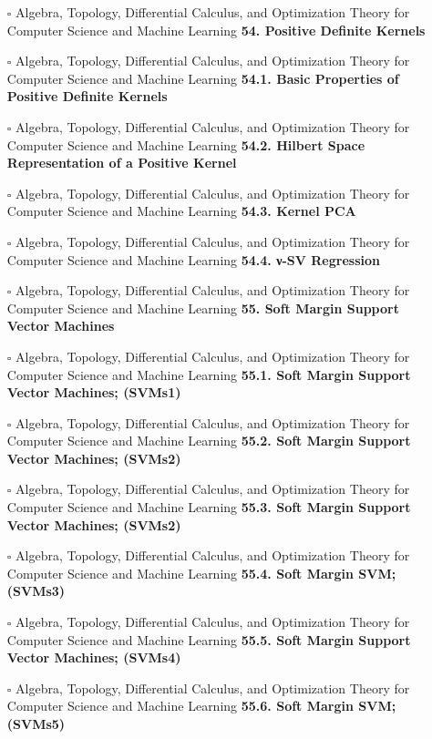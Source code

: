 \documentclass[a4, landscape, 12pt]{article}
\newcommand{\checkbox}{$\square$}%
\begin{document}
\begin{itemize}
{}
\item [\checkbox]  Algebra, Topology, Differential Calculus, and Optimization Theory for Computer Science and Machine Learning \textbf{ 54. Positive Definite Kernels
}
\item [\checkbox]  Algebra, Topology, Differential Calculus, and Optimization Theory for Computer Science and Machine Learning \textbf{ 54.1. Basic Properties of Positive Definite Kernels
}
\item [\checkbox]  Algebra, Topology, Differential Calculus, and Optimization Theory for Computer Science and Machine Learning \textbf{ 54.2. Hilbert Space Representation of a Positive Kernel
}
\item [\checkbox]  Algebra, Topology, Differential Calculus, and Optimization Theory for Computer Science and Machine Learning \textbf{ 54.3. Kernel PCA
}
\item [\checkbox]  Algebra, Topology, Differential Calculus, and Optimization Theory for Computer Science and Machine Learning \textbf{ 54.4. ν-SV Regression
}
\item [\checkbox]  Algebra, Topology, Differential Calculus, and Optimization Theory for Computer Science and Machine Learning \textbf{ 55. Soft Margin Support Vector Machines
}
\item [\checkbox]  Algebra, Topology, Differential Calculus, and Optimization Theory for Computer Science and Machine Learning \textbf{ 55.1. Soft Margin Support Vector Machines; (SVMs1)
}
\item [\checkbox]  Algebra, Topology, Differential Calculus, and Optimization Theory for Computer Science and Machine Learning \textbf{ 55.2. Soft Margin Support Vector Machines; (SVMs2)
}
\item [\checkbox]  Algebra, Topology, Differential Calculus, and Optimization Theory for Computer Science and Machine Learning \textbf{ 55.3. Soft Margin Support Vector Machines; (SVMs2)
}
\item [\checkbox]  Algebra, Topology, Differential Calculus, and Optimization Theory for Computer Science and Machine Learning \textbf{ 55.4. Soft Margin SVM; (SVMs3)
}
\item [\checkbox]  Algebra, Topology, Differential Calculus, and Optimization Theory for Computer Science and Machine Learning \textbf{ 55.5. Soft Margin Support Vector Machines; (SVMs4)
}
\item [\checkbox]  Algebra, Topology, Differential Calculus, and Optimization Theory for Computer Science and Machine Learning \textbf{ 55.6. Soft Margin SVM; (SVMs5)
}
\end{itemize}
\end{document}
